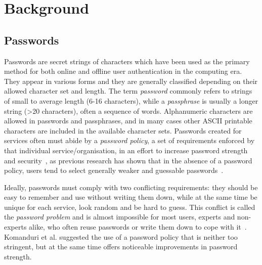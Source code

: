 
\chapter{Background}
\label{cha:background}

  \section{Passwords}
    \label{sec:passwords}
    Passwords are secret strings of characters which have been used as the primary method for both online and offline user authentication in the computing era. They appear in various forms and they are generally classified depending on their allowed character set and length. The term \emph{password} commonly refers to strings of small to average length (6-16 characters), while a \emph{passphrase} is usually a longer string (>20 characters), often a sequence of words. Alphanumeric characters are allowed in passwords and passphrases, and in many cases other ASCII printable characters are included in the available character sets. Passwords created for services often must abide by a \emph{password policy}, a set of requirements enforced by that individual service/organisation, in an effort to increase password strength and security~\cite{pass_policy,NIST_invalid}, as previous research has shown that in the absence of a password policy, users tend to select generally weaker and guessable passwords~\cite{reused_passwords,pass_policy_users_bad}.

    Ideally, passwords must comply with two conflicting requirements: they should be easy to remember and use without writing them down, while at the same time be unique for each service, look random and be hard to guess. This conflict is called the \emph{password problem} and is almost impossible for most users, experts and non-experts alike, who often reuse passwords or write them down to cope with it~\cite{the_password_problem,pass_management}. Komanduri et al. suggested the use of a password policy that is neither too stringent, but at the same time offers noticeable improvements in password strength.

